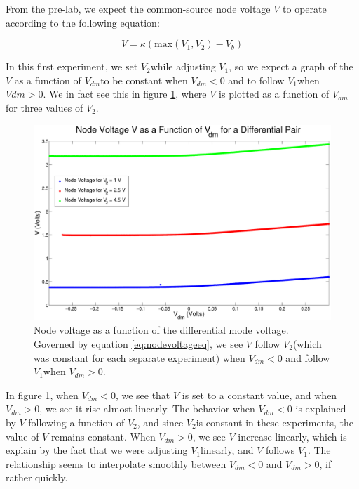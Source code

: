 \documentclass{article}
\newcommand{\Vtwo}{{$V_{2}$}}
\newcommand{\Vone}{{$V_{1}$}}
\newcommand{\Vdm}{{$V_{dm}$}}
\begin{document}
From the pre-lab, we expect the common-source node voltage $V$ to operate according to the following equation:

\begin{equation}
V = \kappa (\textrm{max}(V_1,V_2) - V_b)
\label{eq:nodevoltageeq}
\end{equation}

In this first experiment, we set \Vtwo while adjusting \Vone, so we expect a graph of the $V$ as a function of \Vdm to be constant when $V_{dm} < 0$ and to follow \Vone when $V{dm} > 0$. We in fact see this in figure \ref{fig:nodevoltageWI}, where $V$ is plotted as a function of \Vdm for three values of \Vtwo.

\begin{figure}[H]
\centering
\includegraphics[width=\linewidth]{./Figures/NodeVoltageWeakInversion.eps}
\caption{Node voltage as a function of the differential mode voltage. Governed by equation \ref{eq:nodevoltageeq}, we see $V$ follow \Vtwo (which was constant for each separate experiment) when $V_{dm} < 0$ and follow \Vone when $V_{dm} > 0$.}
\label{fig:nodevoltageWI}
\end{figure}

In figure \ref{fig:nodevoltageWI}, when $V_{dm} < 0$, we see that $V$ is set to a constant value, and when $V_{dm} > 0$, we see it rise almost linearly. The behavior when $V_{dm} < 0$ is explained by $V$ following a function of \Vtwo, and since \Vtwo is constant in these experiments, the value of $V$ remains constant. When $V_{dm} > 0$, we see $V$ increase linearly, which is explain by the fact that we were adjusting \Vone linearly, and $V$ follows \Vone. The relationship seems to interpolate smoothly between $V_{dm} < 0$ and $V_{dm} > 0$, if rather quickly.
\end{document}

